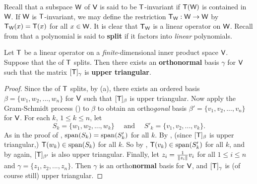 Recall  that a subspace \(\textsf{W}\) of \(\textsf{V}\) is said to be \(\textsf{T}\)-invariant if \(\textsf{T}(\textsf{W})\) is contained in \(\textsf{W}\).
If \(\textsf{W}\) is \(\textsf{T}\)-invariant, we may define the restriction \(\textsf{T}_{\textsf{W}} : \textsf{W} \to \textsf{W}\) by \(\textsf{T}_{\textsf{W}}(x) = \textsf{T}(x)\) for all \(x \in \textsf{W}\).
It is clear that \(\textsf{T}_{\textsf{W}}\) is a linear operator on \(\textsf{W}\).
Recall from  that a polynomial is said to \textbf{split} if it factors into \emph{linear} polynomials.

\begin{theorem} [Schur] \label{thm 6.14}
Let \(\textsf{T}\) be a linear operator on a \emph{finite}-dimensional inner product space \(\textsf{V}\).
Suppose that the \CPOLY{} of \(\textsf{T}\) splits.
Then there exists an \textbf{orthonormal} basis \(\gamma\) for \(\textsf{V}\) such that the matrix \([\textsf{T}]_{\gamma}\) is \textbf{upper triangular}.
\end{theorem}

\begin{proof}
Since the \CPOLY{} of \(\textsf{T}\) splits, by (a), there exists an ordered basis \(\beta = \{ w_1, w_2, ..., w_n \}\) for \(\textsf{V}\) such that \([\textsf{T}]_{\beta}\) is upper triangular.
Now apply the Gram-Schmidt process () to \(\beta\) to obtain an ortho\emph{gonal} basis \(\beta' = \{ v_1, v_2, ..., v_n \}\) for \(\textsf{V}\).
For each \(k\), \(1 \le k \le n\), let
\[
    S_k = \{ w_1, w_2, ..., w_k \} \quad \text{ and } \quad S'_k = \{ v_1, v_2, ..., v_k \}.
\]
As in the proof of , \(\operatorname{span}(S_k) = \operatorname{span}(S'_k)\) for all \(k\). 
By , (since \([\textsf{T}]_{\beta}\) is upper triangular,) \(\textsf{T}(w_k) \in \operatorname{span}(S_k)\) for all \(k\). 
So by , \(\textsf{T}(v_k) \in \operatorname{span}(S'_k)\) for all \(k\), and by  again, \([\textsf{T}]_{\beta'}\) is also upper triangular.
Finally, let \(z_i = \frac{1}{\left\lVert z_i\right\rVert} v_i\) for all \(1 \le i \le n\) and \(\gamma = \{ z_1, z_2, ..., z_n \}\).
Then \(\gamma\) is an ortho\textbf{normal} basis for \(\textsf{V}\), and \([\textsf{T}]_{\gamma}\) is (of course still) upper triangular.
\end{proof}

